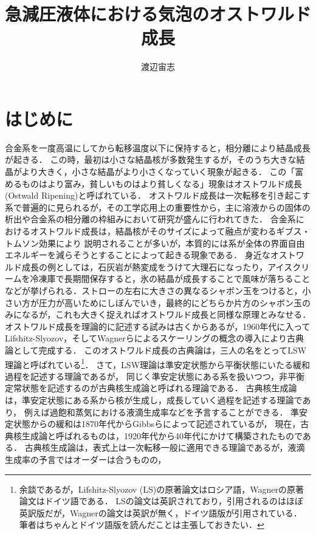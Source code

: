 \documentclass[topics,b5paper,papersize,twocolumn]{jsarticle}
\title{急減圧液体における気泡のオストワルド成長}
\author{渡辺宙志}
\affiliation{東京大学物性研究所附属物質設計評価施設}
\begin{document}
\maketitle

\section{はじめに}

合金系を一度高温にしてから転移温度以下に保持すると，相分離により結晶成長が起きる．
この時，最初は小さな結晶核が多数発生するが，そのうち大きな結晶がより大きく，小さな結晶がより小さくなっていく現象が起きる．
この「富めるものはより富み，貧しいものはより貧しくなる」現象はオストワルド成長(Ostwald Ripening)と呼ばれている．
オストワルド成長は一次転移を引き起こす系で普遍的に見られるが，その工学応用上の重要性から，主に溶液からの固体の析出や合金系の相分離の枠組みにおいて研究が盛んに行われてきた\cite{Baldan}．
合金系におけるオストワルド成長は，結晶核がそのサイズによって融点が変わるギブス・トムソン効果により
説明されることが多いが，本質的には系が全体の界面自由エネルギーを減らそうとすることによって起きる現象である．
身近なオストワルド成長の例としては，石灰岩が熱変成をうけて大理石になったり，アイスクリームを冷凍庫で長期間保存すると，氷の結晶が成長することで風味が落ちることなどが挙げられる\cite{ice}．ストローの左右に大きさの異なるシャボン玉をつけると，小さい方が圧力が高いためにしぼんでいき，最終的にどちらか片方のシャボン玉のみになるが，これも大きく捉えればオストワルド成長と同様な原理とみなせる．
オストワルド成長を理論的に記述する試みは古くからあるが，1960年代に入って
Lifshitz-Slyozov，そしてWagnerらによるスケーリングの概念の導入により古典論として完成する\cite{LS,Wagner}．
このオストワルド成長の古典論は，三人の名をとってLSW理論と呼ばれている\footnote{
余談であるが，Lifshitz-Slyozov (LS)の原著論文はロシア語，Wagnerの原著論文はドイツ語である．
LSの論文は英訳されており，引用されるのはほぼ英訳版だが，Wagnerの論文は英訳が無く，ドイツ語版が引用されている．
筆者はちゃんとドイツ語版を読んだことは主張しておきたい．
}．
さて，LSW理論は準安定状態から平衡状態にいたる緩和過程を記述する理論であるが，
同じく準安定状態にある系を扱いつつ，非平衡定常状態を記述するのが古典核生成論と呼ばれる理論である．
古典核生成論は，準安定状態にある系から核が生成し，成長していく過程を記述する理論であり，
例えば過飽和蒸気における液滴生成率などを予言することができる．
準安定状態からの緩和は1870年代からGibbsらによって記述されているが\cite{Gibbs}，
現在，古典核生成論と呼ばれるものは，1920年代から40年代にかけて構築されたものである\cite{CNT}．
古典核生成論は，表式上は一次転移一般に適用できる理論であるが，液滴生成率の予言ではオーダーは合うものの\cite{Horsch}，
\end{document}
